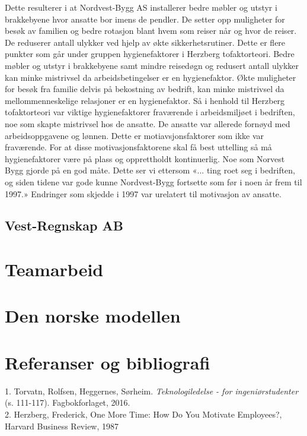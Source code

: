 \documentclass[11]{article}
\begin{document}
Dette resulterer i at Nordvest-Bygg AS installerer bedre møbler og utstyr i brakkebyene hvor ansatte bor imens de pendler. De setter opp muligheter for besøk av familien og bedre rotasjon blant hvem som reiser når og hvor de reiser. De reduserer antall ulykker ved hjelp av økte sikkerhetsrutiner. Dette er flere punkter som går under gruppen hygienefaktorer i Herzberg tofaktorteori. Bedre møbler og utstyr i brakkebyene samt mindre reisedøgn og redusert antall ulykker kan minke mistrivsel da arbeidsbetingelser er en hygienefaktor. Økte muligheter for besøk fra familie delvis på bekostning av bedrift, kan minke mistrivsel da mellommenneskelige relasjoner er en hygienefaktor. Så i henhold til Herzberg tofaktorteori var viktige hygienefaktorer fraværende i arbeidsmiljøet i bedriften, noe som skapte mistrivsel hos de ansatte. De ansatte var allerede fornøyd med arbeidsoppgavene og lønnen. Dette er motiavsjonsfaktorer som ikke var fraværende. For at disse motivasjonsfaktorene skal få best uttelling så må hygienefaktorer være på plass og opprettholdt kontinuerlig. Noe som Norvest Bygg gjorde på en god måte. Dette ser vi ettersom «... ting roet seg i bedriften, og siden tidene var gode kunne Nordvest-Bygg fortsette som før i noen år frem til 1997.» Endringer som skjedde i 1997 var urelatert til motivasjon av ansatte. 

\subsection{Vest-Regnskap AB}

\newpage
\section{Teamarbeid}

\newpage
\section{Den norske modellen}


\newpage
\section{Referanser og bibliografi}

1.  Torvatn, Rolfsen, Heggernes, Sørheim. \textit{Teknologiledelse - for ingeniørstudenter} (s. 111-117). Fagbokforlaget, 2016. \\
2. Herzberg, Frederick, One More Time: How Do You Motivate Employees?, Harvard Business Review, 1987 \\
\end{document}
